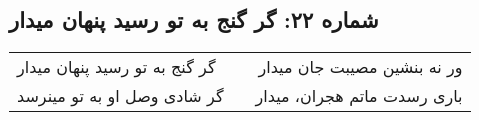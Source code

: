 \begin{center}
\section*{شماره ۲۲: گر گنج به تو رسید پنهان میدار}
\label{sec:022}
\begin{longtable}{l p{0.5cm} r}
گر گنج به تو رسید پنهان میدار
&&
ور نه بنشین مصیبت جان میدار
\\
گر شادی وصل او به تو مینرسد
&&
باری رسدت ماتم هجران، میدار
\\
\end{longtable}
\end{center}
